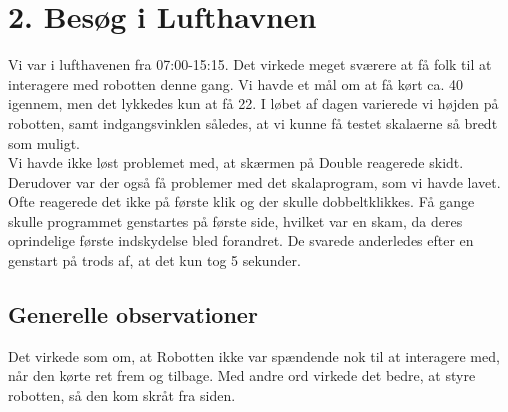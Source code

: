 \section{2. Besøg i Lufthavnen}
\label{TestAfSkalaLufthavnsBesog}
%
Vi var i lufthavenen fra 07:00-15:15. Det virkede meget sværere at få folk til at interagere med robotten denne gang. Vi havde et mål om at få kørt ca. 40 igennem, men det lykkedes kun at få 22. I løbet af dagen varierede vi højden på robotten, samt indgangsvinklen således, at vi kunne få testet skalaerne så bredt som muligt.\\
Vi havde ikke løst problemet med, at skærmen på Double reagerede skidt. Derudover var der også få problemer med det skalaprogram, som vi havde lavet. Ofte reagerede det ikke på første klik og der skulle dobbeltklikkes. Få gange skulle programmet genstartes på første side, hvilket var en skam, da deres oprindelige første indskydelse bled forandret. De svarede anderledes efter en genstart på trods af, at det kun tog 5 sekunder.

\subsection{Generelle observationer}
Det virkede som om, at Robotten ikke var spændende nok til at interagere med, når den kørte ret frem og tilbage. Med andre ord virkede det bedre, at styre robotten, så den kom skråt fra siden. 